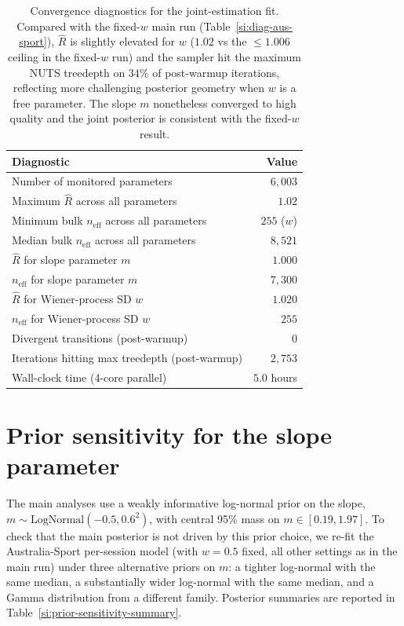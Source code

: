 \documentclass[11pt]{article}
\begin{document}
\begin{table}[ht]
\centering
\begin{tabular}{lr}
\toprule
{\bf Diagnostic} & {\bf Value} \\
\midrule
Number of monitored parameters & $6{,}003$ \\
Maximum $\hat{R}$ across all parameters & $1.02$ \\
Minimum bulk $n_{\mathrm{eff}}$ across all parameters & $255$ ($w$) \\
Median bulk $n_{\mathrm{eff}}$ across all parameters & $8{,}521$ \\
$\hat{R}$ for slope parameter $m$ & $1.000$ \\
$n_{\mathrm{eff}}$ for slope parameter $m$ & $7{,}300$ \\
$\hat{R}$ for Wiener-process SD $w$ & $1.020$ \\
$n_{\mathrm{eff}}$ for Wiener-process SD $w$ & $255$ \\
Divergent transitions (post-warmup) & $0$ \\
Iterations hitting max treedepth (post-warmup) & $2{,}753$ \\
Wall-clock time (4-core parallel) & $5.0$ hours \\
\bottomrule
\end{tabular}
\caption{Convergence diagnostics for the joint-estimation fit. Compared with the fixed-$w$ main run (Table~\ref{si:diag-aus-sport}), $\hat{R}$ is slightly elevated for $w$ ($1.02$ vs the $\leq 1.006$ ceiling in the fixed-$w$ run) and the sampler hit the maximum NUTS treedepth on $34\%$ of post-warmup iterations, reflecting more challenging posterior geometry when $w$ is a free parameter. The slope $m$ nonetheless converged to high quality and the joint posterior is consistent with the fixed-$w$ result.}
\label{si:diag-joint-w}
\end{table}


\section{Prior sensitivity for the slope parameter}
\label{si:prior-sensitivity}

The main analyses use a weakly informative log-normal prior on the slope, $m \sim \mathrm{LogNormal}(-0.5, 0.6^2)$, with central 95\% mass on $m \in [0.19, 1.97]$. To check that the main posterior is not driven by this prior choice, we re-fit the Australia-Sport per-session model (with $w = 0.5$ fixed, all other settings as in the main run) under three alternative priors on $m$: a tighter log-normal with the same median, a substantially wider log-normal with the same median, and a Gamma distribution from a different family. Posterior summaries are reported in Table~\ref{si:prior-sensitivity-summary}.
\end{document}
